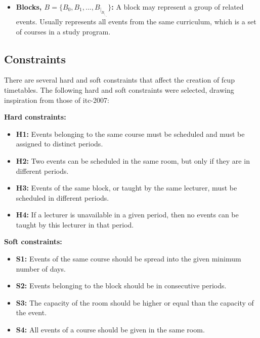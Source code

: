 \begin{itemize}
	\item \textbf{Blocks, \(B = \{B_0, B_1, ..., B_|_B_|_-_1\}\):} A block may represent a group of related events. Usually represents all events from the same curriculum, which is a set of courses in a study program.
\end{itemize}

\subsection{Constraints}

There are several hard and soft constraints that affect the creation of \ac{fcup} timetables. The following hard and soft constraints were selected, drawing inspiration from those of \ac{itc-2007}:

\textbf{Hard constraints:}

\begin{itemize}
	\item \textbf{H1:} Events belonging to the same course must be scheduled and must be assigned to distinct periods.
	\item \textbf{H2:} Two events can be scheduled in the same room, but only if they are in different periods.
	\item \textbf{H3:} Events of the same block, or taught by the same lecturer, must be scheduled in different periods.
	\item \textbf{H4:} If a lecturer is unavailable in a given period, then no events can be taught by this lecturer in that period.
\end{itemize}

\textbf{Soft constraints:}

\begin{itemize}
	\item \textbf{S1:} Events of the same course should be spread into the given minimum number of days.
	\item \textbf{S2:} Events belonging to the block should be in consecutive periods.
	\item \textbf{S3:} The capacity of the room should be higher or equal than the capacity of the event.
	\item \textbf{S4:} All events of a course should be given in the same room.
\end{itemize}

